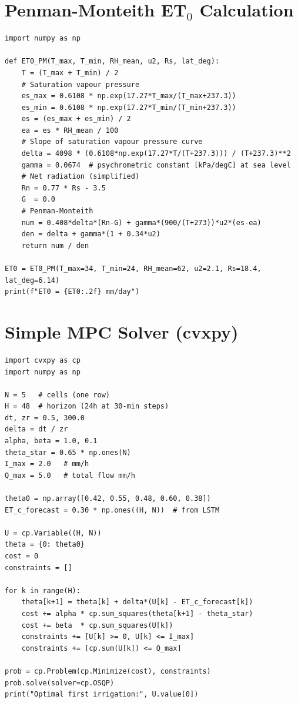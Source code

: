 \documentclass[12pt,a4paper,openany]{book}
\begin{document}
\section{Penman-Monteith ET$_0$ Calculation}
\begin{verbatim}
import numpy as np

def ET0_PM(T_max, T_min, RH_mean, u2, Rs, lat_deg):
    T = (T_max + T_min) / 2
    # Saturation vapour pressure
    es_max = 0.6108 * np.exp(17.27*T_max/(T_max+237.3))
    es_min = 0.6108 * np.exp(17.27*T_min/(T_min+237.3))
    es = (es_max + es_min) / 2
    ea = es * RH_mean / 100
    # Slope of saturation vapour pressure curve
    delta = 4098 * (0.6108*np.exp(17.27*T/(T+237.3))) / (T+237.3)**2
    gamma = 0.0674  # psychrometric constant [kPa/degC] at sea level
    # Net radiation (simplified)
    Rn = 0.77 * Rs - 3.5
    G  = 0.0
    # Penman-Monteith
    num = 0.408*delta*(Rn-G) + gamma*(900/(T+273))*u2*(es-ea)
    den = delta + gamma*(1 + 0.34*u2)
    return num / den

ET0 = ET0_PM(T_max=34, T_min=24, RH_mean=62, u2=2.1, Rs=18.4, lat_deg=6.14)
print(f"ET0 = {ET0:.2f} mm/day")
\end{verbatim}

\section{Simple MPC Solver (cvxpy)}
\begin{verbatim}
import cvxpy as cp
import numpy as np

N = 5   # cells (one row)
H = 48  # horizon (24h at 30-min steps)
dt, zr = 0.5, 300.0
delta = dt / zr
alpha, beta = 1.0, 0.1
theta_star = 0.65 * np.ones(N)
I_max = 2.0   # mm/h
Q_max = 5.0   # total flow mm/h

theta0 = np.array([0.42, 0.55, 0.48, 0.60, 0.38])
ET_c_forecast = 0.30 * np.ones((H, N))  # from LSTM

U = cp.Variable((H, N))
theta = {0: theta0}
cost = 0
constraints = []

for k in range(H):
    theta[k+1] = theta[k] + delta*(U[k] - ET_c_forecast[k])
    cost += alpha * cp.sum_squares(theta[k+1] - theta_star)
    cost += beta  * cp.sum_squares(U[k])
    constraints += [U[k] >= 0, U[k] <= I_max]
    constraints += [cp.sum(U[k]) <= Q_max]

prob = cp.Problem(cp.Minimize(cost), constraints)
prob.solve(solver=cp.OSQP)
print("Optimal first irrigation:", U.value[0])
\end{verbatim}
\end{document}
